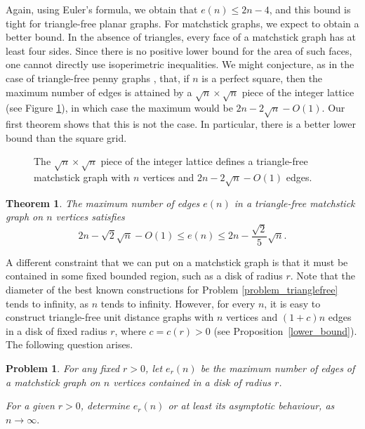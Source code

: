 \documentclass[12pt]{article}
\theoremstyle{plain}
\newtheorem{theorem}{Theorem}
\newtheorem{problem}{Problem}
\theoremstyle{definition}
\theoremstyle{remark}
\begin{document}
Again, using Euler's formula, we obtain that $e(n) \leq 2n-4$, and this bound is tight for triangle-free planar graphs. For matchstick graphs, we expect to obtain a better bound. In the absence of triangles, every face of a matchstick graph has at least four sides. Since there is no positive lower bound for the area of such faces, one cannot directly use  isoperimetric inequalities.
We might conjecture, as in the case of triangle-free penny graphs \cite{S09}, that, if $n$ is a perfect square, then the maximum number of edges is attained  by a $\sqrt n \times \sqrt n$ piece of the integer lattice (see Figure \ref{fig_grid}), in which case the maximum would be $2n-2\sqrt{n}-O(1)$. Our first theorem shows that this is not the case. In particular, there is a better lower bound than the square grid.

\begin{figure}[h!]
\centering


\caption{The $\sqrt n \times \sqrt n$ piece of the integer lattice defines a triangle-free matchstick graph with $n$ vertices and $2n-2\sqrt{n}-O(1)$ edges.}
\label{fig_grid}
\end{figure}


\begin{theorem}\label{thm1}
The maximum number of edges $e(n)$ in a triangle-free matchstick graph on $n$ vertices satisfies
\[ 2n-\sqrt{2}\sqrt{n}-O(1) \leq e(n)\leq 2n-\frac{\sqrt{2}}{5}\sqrt{n}.    \]
\end{theorem}


A different constraint that we can put on a matchstick graph is that it must be contained in some fixed bounded region, such as a disk of radius $r$. Note that the diameter of the best known constructions for Problem \ref{problem_trianglefree} tends to infinity, as $n$ tends to infinity. However, for every $n$, it is easy to construct triangle-free unit distance graphs with $n$ vertices and $(1+c)n$ edges in a disk of fixed radius $r$, where $c=c(r) > 0$ (see Proposition~\ref{lower_bound}). The following question arises.

\begin{problem} \label{problem_boundedmatchstick}
For any fixed $r>0$, let $e_{r}(n)$ be the maximum number of edges of a matchstick graph on $n$ vertices contained in a
disk of radius $r$. 

For a given $r>0$, determine $e_{r}(n)$ or at least its asymptotic behaviour, as $n\rightarrow\infty.$ 
\end{problem}
\end{document}
